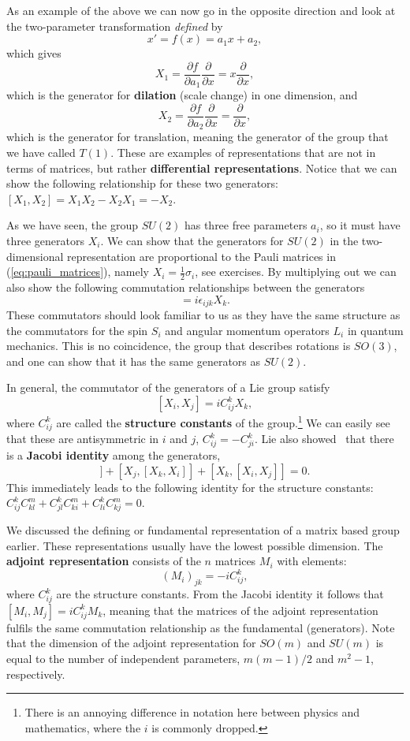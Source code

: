 \documentclass[notes.tex]{subfiles}
\begin{document}
As an example of the above we can now go in the opposite direction and look at the two-parameter transformation {\it defined} by
\[x' = f(x) = a_1x + a_2,\]
which gives
\[X_1 = \frac{\partial f}{\partial a_1} \frac{\partial}{\partial x} = x\frac{\partial}{\partial x},\]
which is the generator for {\bf dilation} (scale change) in one dimension, and
\[X_2 =  \frac{\partial f}{\partial a_2} \frac{\partial}{\partial x} =\frac{\partial}{\partial x},\]
which is the generator for translation, meaning the generator of the group that we have called $T(1)$. These are examples of representations that are not in terms of matrices, but rather {\bf differential representations}.
Notice that we can show the following relationship for these two generators: $[X_1, X_2] =X_1X_2-X_2X_1= -X_2$.

As we have seen, the group $SU(2)$ has three free parameters $a_i$, so it must have three generators $X_i$. We can show that the generators for $SU(2)$ in the two-dimensional representation are proportional to the Pauli matrices in (\ref{eq:pauli_matrices}), namely $X_i=\frac{1}{2}\sigma_i$, see exercises. By multiplying out we can also show the following commutation relationships between the generators
\begin{equation}
[X_i,X_j]=i\epsilon_{ijk}X_k.
\label{eq:su2_algebra}
\end{equation}
These commutators should look familiar to us as they have the same structure as the commutators for the spin $S_i$ and angular momentum operators $L_i$ in quantum mechanics. This is no coincidence, the group that describes rotations is $SO(3)$, and one can show that it has the same generators as $SU(2)$.

In general, the commutator of the generators of a Lie group satisfy \[[X_i,X_j]=iC_{ij}^kX_k,\] where  $C^k_{ij}$ are called the {\bf structure constants} of the group.\footnote{There is an annoying difference in notation here between physics and mathematics, where the $i$ is commonly dropped.} 
We can easily see that  these are antisymmetric in $i$ and $j$, $C^k_{ij} = -C_{ji}^k$. Lie also showed~\cite{MR1510035} that there is a {\bf Jacobi identity} among the generators,
\begin{equation}
[X_i, [X_j, X_k]] + [X_j, [X_k, X_i]] + [X_k, [X_i, X_j]] = 0.
\end{equation}
This immediately leads to the following identity for the structure constants:  $C^{k}_{ij}C^{m}_{kl} + C^{k}_{jl}C^{m}_{ki} + C_{li}^kC_{kj}^m = 0$.

We discussed the defining or fundamental representation of a matrix based group earlier. These representations usually have the lowest possible dimension. The {\bf adjoint representation} consists of the $n$ matrices $M_i$ with elements:
\[(M_i)_{jk} = -iC^k_{ij},\]
where $C^k_{ij}$ are the structure constants. From the Jacobi identity it follows that $[M_i, M_j] = iC^k_{ij}M_k$, meaning that the matrices of the adjoint representation fulfils the same commutation relationship as the fundamental (generators). Note that the dimension of the adjoint representation for $SO(m)$ and $SU(m)$ is equal to the number of independent parameters, $m(m-1)/2$ and $m^2-1$, respectively.
\end{document}
